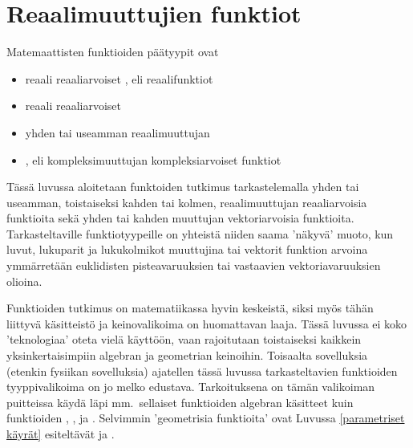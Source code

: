 \chapter{Reaalimuuttujien funktiot}

Matemaattisten funktioiden päätyypit ovat
\begin{itemize}
\item {} reaali reaaliarvoiset , eli reaalifunktiot
\item {} reaali reaaliarvoiset 
\item yhden tai useamman reaalimuuttujan 
\item {}, eli kompleksimuuttujan kompleksiarvoiset funktiot
\end{itemize}
Tässä luvussa aloitetaan funktoiden tutkimus tarkastelemalla yhden tai useamman, toistaiseksi
kahden tai kolmen, reaalimuuttujan reaaliarvoisia funktioita sekä yhden tai kahden muuttujan
vektoriarvoisia funktioita. Tarkasteltaville funktiotyypeille on yhteistä niiden saama 'näkyvä'
muoto, kun luvut, lukuparit ja lukukolmikot muuttujina tai vektorit funktion arvoina ymmärretään
euklidisten pisteavaruuksien tai vastaavien vektoriavaruuksien olioina.

Funktioiden tutkimus on matematiikassa hyvin keskeistä, siksi myös tähän liittyvä käsitteistö
ja keinovalikoima on huomattavan laaja. Tässä luvussa ei koko 'teknologiaa' oteta vielä käyttöön,
vaan rajoitutaan toistaiseksi kaikkein yksinkertaisimpiin algebran ja geometrian keinoihin.
Toisaalta sovelluksia (etenkin fysiikan sovelluksia) ajatellen tässä luvussa tarkasteltavien
funktioiden tyyppivalikoima on jo melko edustava. Tarkoituksena on tämän valikoiman puitteissa
käydä läpi mm.\ sellaiset funktioiden algebran käsitteet kuin funktioiden 
, ,  ja
. Selvimmin 'geometrisia funktioita' ovat Luvussa
\ref{parametriset käyrät} esiteltävät  ja .